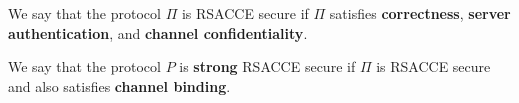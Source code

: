 \begin{definition}
 We say that the protocol $\Pi$ is RSACCE secure if $\Pi$ satisfies \textbf{correctness},
 \textbf{server authentication}, and \textbf{channel confidentiality}.
\end{definition}

\begin{definition}
 We say that the protocol $P$ is \textbf{strong} RSACCE secure if $\Pi$ is RSACCE secure
 and also satisfies \textbf{channel binding}.
\end{definition}